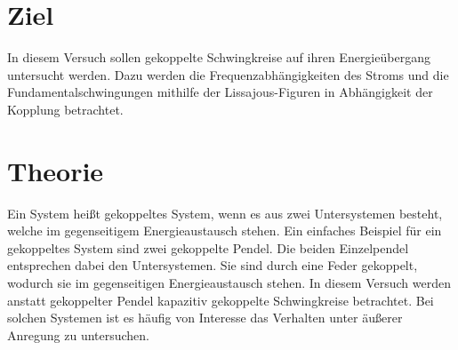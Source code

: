\section{Ziel}
\label{sec:Ziel}
In diesem Versuch sollen gekoppelte Schwingkreise auf ihren Energieübergang untersucht werden. Dazu werden die Frequenzabhängigkeiten des Stroms und die Fundamentalschwingungen mithilfe der Lissajous-Figuren 
in Abhängigkeit der Kopplung betrachtet.
\section{Theorie}
\label{sec:Theorie}
Ein System heißt \dq gekoppeltes\dq\; System, wenn es aus zwei Untersystemen
besteht, welche im gegenseitigem Energieaustausch stehen. Ein einfaches Beispiel für ein gekoppeltes System sind zwei gekoppelte Pendel. Die beiden Einzelpendel entsprechen dabei den Untersystemen.
Sie sind durch eine Feder gekoppelt, wodurch sie im gegenseitigen Energieaustausch stehen. In diesem Versuch werden anstatt gekoppelter Pendel kapazitiv gekoppelte Schwingkreise betrachtet.
Bei solchen Systemen ist es häufig von Interesse das Verhalten unter äußerer Anregung zu untersuchen.
